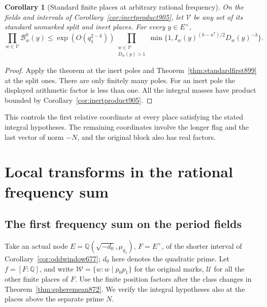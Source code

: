 \documentclass[a4paper,11pt]{article}
\newtheorem{corollary}[proposition]{Corollary}
\theoremstyle{definition}
\theoremstyle{remark}
\numberwithin{equation}{section}
\begin{document}
\begin{corollary}[Standard finite places at arbitrary rational frequency]
\leavevmode\label{cor:standardall908}
On the fields and intervals of
Corollary~\ref{cor:inertproduct905}, let \(\mathcal V\) be any
set of its standard unmarked split and inert places.
For every \(y\in E^\times\),
\[
       \prod_{w\in\mathcal V}\mathcal B_w^0(y)
          \le \exp(O(q_1^{2-k}))
               \prod_{\substack{w\in\mathcal V\\D_w(y)>1}}
                    \min\{1,I_w(y)^{(k-n^7)/2}D_w(y)^{-3}\}.
\]
\end{corollary}
\begin{proof}
Apply the theorem at the inert poles and
Theorem~\ref{thm:standardfirst899} at the split ones. There
are only finitely many poles. For an inert pole the displayed
arithmetic factor is less than one. All the integral masses
have product bounded by Corollary~\ref{cor:inertproduct905}.
\end{proof}

This controls the first relative coordinate at every place
satisfying the stated integral hypotheses. The remaining
coordinates involve the longer flag and the last vector of norm
\(-N\), and the original block also has real factors.
\clearpage

\section{Local transforms in the rational frequency sum}\label{nav:local-rational-frequency-sum}

\subsection{The first frequency sum on the period fields}
\label{sec:firstglobal909}

Take an actual node \(E=\mathbb Q(\sqrt{-d_0},\mu_{q_1})\),
\(F=E^+\), of the shorter interval of
Corollary~\ref{cor:oddwindow677}; \(d_0\) here denotes the
quadratic prime. Let \(f=[F:\mathbb Q]\), and write
\(\mathcal W=\{w:w\mid p_0p_1\}\) for the original marks,
\(\mathcal U\) for all the other finite places of \(F\).
Use the finite position factors after the class changes in
Theorem~\ref{thm:spheremean872}. We verify the integral
hypotheses also at the places above the separate prime \(N\).
\end{document}
